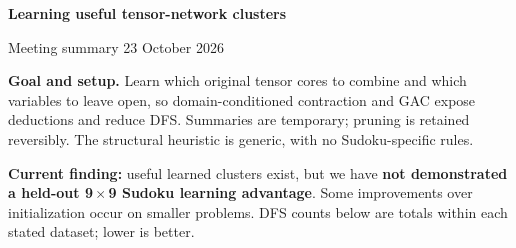 \documentclass[10pt,a4paper]{article}
\begin{document}
{\color{ink}\LARGE\bfseries Learning useful tensor-network clusters}\par
{\color{muted}Meeting summary \hfill 23 October 2026}
\vspace{3pt}

\textbf{Goal and setup.} Learn which original tensor cores to combine and which variables to leave open, so domain-conditioned contraction and GAC expose deductions and reduce DFS. Summaries are temporary; pruning is retained reversibly. The structural heuristic is generic, with no Sudoku-specific rules.

\textbf{Current finding:} useful learned clusters exist, but we have \textbf{not demonstrated a held-out 9\,$\times$\,9 Sudoku learning advantage}. Some improvements over initialization occur on smaller problems. DFS counts below are totals within each stated dataset; lower is better.
\end{document}
